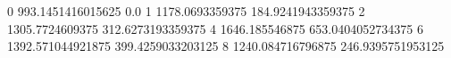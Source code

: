 0 993.1451416015625 0.0
1 1178.0693359375 184.9241943359375
2 1305.7724609375 312.6273193359375
4 1646.185546875 653.0404052734375
6 1392.571044921875 399.4259033203125
8 1240.084716796875 246.9395751953125
